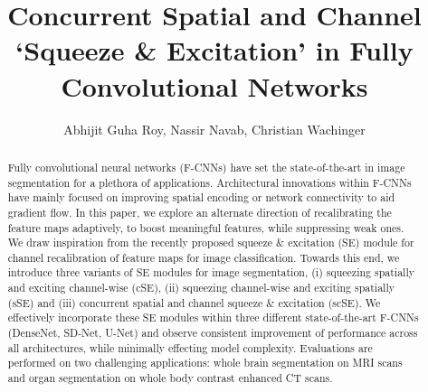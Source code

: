 \documentclass{llncs}
\begin{document}
\title{Concurrent Spatial and Channel `Squeeze \& Excitation' in Fully Convolutional Networks}

\author{Abhijit Guha Roy, Nassir Navab, Christian Wachinger}

\maketitle %
\begin{abstract}
Fully convolutional neural networks (F-CNNs) have set the state-of-the-art in image segmentation for a plethora of applications. Architectural innovations within F-CNNs have mainly  focused on improving spatial encoding or network connectivity to aid gradient flow. In this paper, we explore an alternate direction of recalibrating the feature maps adaptively, to  boost meaningful features, while suppressing weak ones. We draw inspiration from the recently proposed squeeze \& excitation (SE)  module for channel recalibration of  feature maps for  image classification. Towards this end, we introduce three variants of SE modules for image segmentation, (i) squeezing spatially and exciting channel-wise (cSE), (ii) squeezing channel-wise and exciting spatially (sSE) and (iii) concurrent spatial and channel squeeze \& excitation (scSE). We effectively incorporate these SE modules within three different state-of-the-art F-CNNs (DenseNet, SD-Net, U-Net) and observe consistent improvement of performance across all architectures, while minimally effecting model complexity. Evaluations are performed on two challenging applications: whole brain segmentation on MRI scans and organ segmentation on whole body contrast enhanced CT scans. 

\end{abstract}
\end{document}
